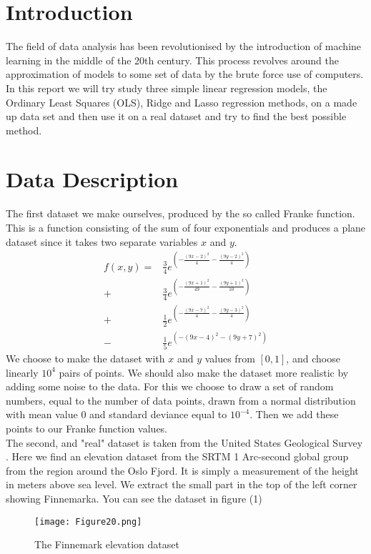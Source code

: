 \documentclass[11pt, A4paper, english]{article}
\begin{document}
	
	\begin{multicols}{2}
		\section{Introduction}
The field of data analysis has been revolutionised by the introduction of machine learning in the middle of the 20th century. This process revolves around the approximation of models to some set of data by the brute force use of computers. In this report we will try study three simple linear regression models, the Ordinary Least Squares (OLS), Ridge and Lasso regression methods, on a made up data set and then use it on a real dataset and try to find the best possible method.
		
		\section{Data Description}
The first dataset we make ourselves, produced by the so called Franke function. This is a function consisting of the sum of four exponentials and produces a plane dataset since it takes two separate variables $x$ and $y$.
		\begin{align}
f(x, y) =& \frac{3}{4} e^{\left( - \frac{\left( 9x - 2 \right)^2}{4} - \frac{\left( 9y - 2 \right)^2}{4} \right)} \\
\nonumber +& \frac{3}{4} e^{\left( - \frac{\left( 9x + 1 \right)^2}{49} - \frac{\left( 9y + 1 \right)^2}{10} \right)} \\
\nonumber +& \frac{1}{2} e^{\left( - \frac{\left( 9x - 7 \right)^2}{4} - \frac{\left( 9y - 3 \right)^2}{4} \right)} \\
\nonumber -& \frac{1}{5} e^{\left( - \left( 9x - 4 \right)^2 - \left( 9y + 7 \right)^2 \right)}
		\end{align}
We choose to make the dataset with $x$ and $y$ values from $[0, 1]$, and choose linearly $10^4$ pairs of points. We should also make the dataset more realistic by adding some noise to the data. For this we choose to draw a set of random numbers, equal to the number of data points, drawn from a normal distribution with mean value $0$ and standard deviance equal to $10^{-4}$. Then we add these points to our Franke function values. \\
The second, and "real" dataset is taken from the United States Geological Survey \cite{USGS}. Here we find an elevation dataset from the SRTM 1 Arc-second global group from the region around the Oslo Fjord.  It is simply a measurement of the height in meters above sea level. We extract the small part in the top of the left corner showing Finnemarka. You can see the dataset in figure (1)
		\begin{figure}[H]
\texttt{[image: Figure20.png]}
\caption{The Finnemark elevation dataset}
		\end{figure}


\end{multicols}
\end{document}
